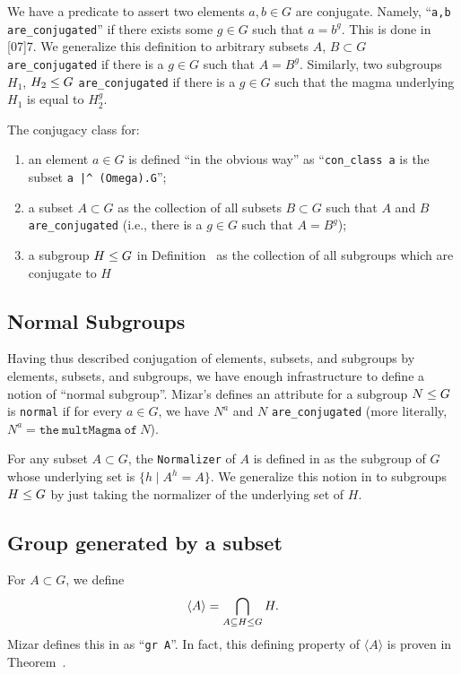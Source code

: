 We have a predicate to assert two elements $a,b\in G$ are
conjugate. Namely, ``\verb#a,b are_conjugated#'' if there exists some
$g\in G$ such that $a = b^{g}$. This is done in
[07]{7}. We generalize this
definition to arbitrary subsets $A$, $B\subset G$ \verb#are_conjugated# if
there is a $g\in G$ such that $A = B^{g}$. Similarly, two subgroups
$H_{1}$, $H_{2}\leq G$ \verb#are_conjugated# if there is a $g\in G$
such that the magma underlying $H_{1}$ is equal to $H_{2}^{g}$.

The conjugacy class for:
\begin{enumerate}
\item an element $a\in G$ is defined ``in the obvious way''
as ``\texttt{con\_class a}
is the subset \verb#a |^ (Omega).G#'';
\item a subset $A\subset G$ as the collection of all subsets $B\subset G$
such that $A$ and $B$ \verb#are_conjugated# (i.e., there is a $g\in G$
such that $A = B^{g}$);
\item a subgroup $H\leq G$ in Definition~ as the
  collection of all subgroups which are conjugate to $H$
\end{enumerate}

\subsection{Normal Subgroups}
Having thus described conjugation of elements, subsets, and subgroups by
elements, subsets, and subgroups, we have enough infrastructure to
define a notion of ``normal subgroup''. Mizar's
 defines an attribute for a subgroup
$N\leq G$ is \verb#normal# if for
every $a\in G$, we have $N^{a}$ and $N$ \verb#are_conjugated# (more
literally, $N^{a} = \mathtt{the~multMagma~of~}N$).

For any subset $A\subset G$, the \lstinline{Normalizer} of $A$ is defined in
 as the subgroup of $G$ whose
underlying set is $\{h \mid A^{h} = A\}$. We generalize this notion in
 to subgroups $H\leq G$ by just taking the
normalizer of the underlying set of $H$.

\subsection{Group generated by a subset}
For $A\subset G$, we define
\begin{equation}
\langle A\rangle = \bigcap_{A\subseteq H\leq G} H.
\end{equation}
Mizar defines this in  as
``\verb#gr A#''. In fact, this defining
property of $\langle A\rangle$ is proven in Theorem~.

